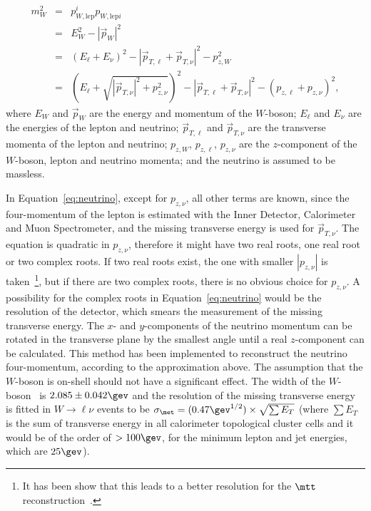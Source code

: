 \begin{eqnarray}
\displaystyle
m_W^2&=&p_{W, \textrm{lep}}^i p_{W, \textrm{lep} i} \nonumber \\
&=&E_W^2 - |\vec{p}_W|^2 \nonumber \\
&=&(E_\ell+E_\nu)^2 - |\vec{p}_{T,\ell} + \vec{p}_{T,\nu}|^2 - p_{z,W}^2 \nonumber \\
&=&(E_\ell+\sqrt{|\vec{p}_{T,\nu}|^2 + p_{z,\nu}^2})^2 - |\vec{p}_{T,\ell} + \vec{p}_{T,\nu}|^2 - (p_{z,\ell} + p_{z,\nu})^2,
\label{eq:neutrino}
\end{eqnarray}
where $E_W$ and $\vec{p}_W$ are the energy and momentum of the $W$-boson; $E_\ell$ and $E_\nu$ are the energies of the lepton and neutrino;
$\vec{p}_{T,\ell}$ and $\vec{p}_{T,\nu}$ are the transverse momenta of the lepton and neutrino; $p_{z,W}$, $p_{z,\ell}$, $p_{z,\nu}$ are the $z$-component of the
$W$-boson, lepton and neutrino momenta; and the neutrino is assumed to be massless.

In Equation~\ref{eq:neutrino}, except for $p_{z,\nu}$, all other terms are known, since the four-momentum of the lepton is estimated with the Inner Detector,
Calorimeter and Muon Spectrometer, and the missing transverse energy is used for $\vec{p}_{T,\nu}$. The equation is 
quadratic
in
$p_{z,\nu}$, therefore it might have two real roots, one
real root or two complex roots. If two real roots exist, the one with smaller $|p_{z,\nu}|$ is taken~\footnote{It has been show that this leads to a better resolution
for the $\mtt$ reconstruction~\cite{ttres7paper}.}, but if there are two complex roots, there is no obvious choice for
$p_{z,\nu}$. A possibility for the complex roots in Equation~\ref{eq:neutrino} would be the resolution of the detector, which smears the measurement of the missing
transverse energy. The $x$- and $y$-components of the neutrino momentum can be rotated in the transverse plane by the smallest angle until a real $z$-component can be calculated.
This method has been implemented to reconstruct the neutrino four-momentum, according to the approximation above. The assumption that the $W$-boson is on-shell
should not have a significant effect. The width of the $W$-boson~\cite{pdg2012} is $2.085 \pm 0.042 \gev$ and the resolution of the missing transverse energy~\cite{atlas7met}
is fitted in $W \rightarrow \ell \nu$ events to be $\sigma_{\met} = (0.47 \gev^{1/2}) \times \sqrt{\sum E_T}$ (where $\sum E_T$ is the sum of transverse energy in all calorimeter
topological cluster cells and it would be of the order of $> 100 \gev$, for the minimum lepton and jet energies, which are $25\gev$).

